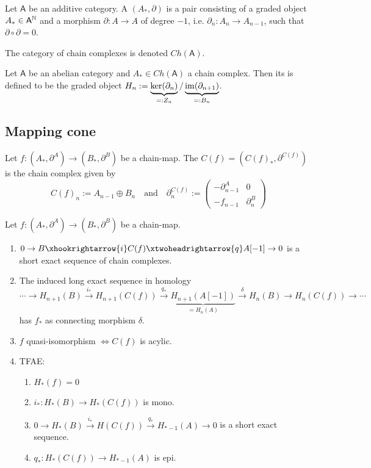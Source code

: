 \documentclass[fontsize=11pt,fleqn,a4paper]{scrartcl}
\begin{document}
\begin{definition}
Let $\mathsf{A}$ be an additive category. A  $(A_\ast,\partial)$ is a pair consisting of a graded object $A_\ast\in\mathsf{A}^{\mathbb{N}}$ and a morphism $\partial: A\to A$ of degree $-1$, i.e. $\partial_n : A_n \to A_{n-1}$, such that $\partial\circ\partial=0$.

The category of chain complexes is denoted $Ch(\mathsf{A})$.
\end{definition}

\begin{definition}[Homology]
Let $\mathsf{A}$ be an abelian category and $A_\ast\in Ch(\mathsf{A})$ a chain complex. Then its  is defined to be the graded object $H_n := \underbrace{\ker(\partial_n)}_{=:Z_n} / \underbrace{\operatorname{im}(\partial_{n+1})}_{=:B_n}$.
\end{definition}

\subsection{Mapping cone}

\begin{definition}
Let $f:(A_\ast,\partial^A)\to(B_\ast,\partial^B)$ be a chain-map. The  $C(f)=(C(f)_\ast,\partial^{C(f)})$ is the chain complex given by
\[C(f)_n := A_{n-1} \oplus B_n \quad\text{and}\quad \partial_n^{C(f)} := \begin{pmatrix}-\partial_{n-1}^A & 0 \\ -f_{n-1} & \partial_n^B \end{pmatrix}\]
\end{definition}

\begin{lemma}
Let $f:(A_\ast,\partial^A)\to(B_\ast,\partial^B)$ be a chain-map.
\begin{enumerate}
\item $0 \to B \xhookrightarrow{i} C(f) \xtwoheadrightarrow{q} A[-1] \to 0$ is a short exact sequence of chain complexes.
\item The induced long exact sequence in homology
\[\cdots \to H_{n+1}(B) \xrightarrow{i_\ast} H_{n+1}(C(f)) \xrightarrow{q_\ast} \underbrace{H_{n+1}(A[-1])}_{=H_n(A)} \xrightarrow{\delta} H_n(B) \to H_n(C(f)) \to \cdots\]
has $f_\ast$ as connecting morphism $\delta$.
\item $f$ quasi-isomorphism $\iff C(f)$ is acylic.
\item TFAE:
\begin{enumerate}
\item $H_\ast(f)=0$
\item $i_\ast: H_\ast(B) \to H_\ast(C(f))$ is mono.
\item $0\to H_\ast(B) \xrightarrow{i_\ast} H(C(f)) \xrightarrow{q_\ast} H_{\ast-1}(A)\to 0$ is a short exact sequence.
\item $q_\ast: H_\ast(C(f)) \to H_{\ast-1}(A)$ is epi.
\end{enumerate}
\end{enumerate}
\end{lemma}
\end{document}
